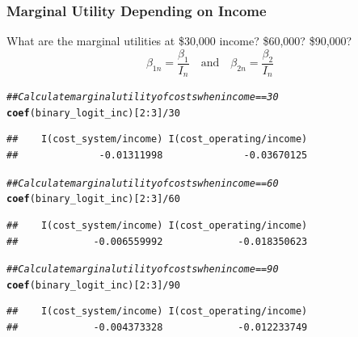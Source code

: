 \documentclass{beamer}\usepackage[]{graphicx}\usepackage[]{color}
\makeatletter
\newcommand{\hlnum}[1]{\textcolor[rgb]{0.686,0.059,0.569}{#1}}%
\newcommand{\hlcom}[1]{\textcolor[rgb]{0.678,0.584,0.686}{\textit{#1}}}%
\newcommand{\hlopt}[1]{\textcolor[rgb]{0,0,0}{#1}}%
\newcommand{\hlstd}[1]{\textcolor[rgb]{0.345,0.345,0.345}{#1}}%
\newcommand{\hlkwd}[1]{\textcolor[rgb]{0.737,0.353,0.396}{\textbf{#1}}}%
\newenvironment{kframe}{%
 \def\at@end@of@kframe{}%
 \ifinner\ifhmode%
  \def\at@end@of@kframe{\end{minipage}}%
  \begin{minipage}{\columnwidth}%
 \fi\fi%
 \def\FrameCommand##1{\hskip\@totalleftmargin \hskip-\fboxsep
 \colorbox{shadecolor}{##1}\hskip-\fboxsep
     \hskip-\linewidth \hskip-\@totalleftmargin \hskip\columnwidth}%
 \MakeFramed {\advance\hsize-\width
   \@totalleftmargin\z@ \linewidth\hsize
   \@setminipage}}%
 {\par\unskip\endMakeFramed%
 \at@end@of@kframe}
\newenvironment{knitrout}{}{} %
\makeatother
\begin{document}
\begin{frame}[fragile]\frametitle{Marginal Utility Depending on Income}
    What are the marginal utilities at \$30,000 income? \$60,000? \$90,000?
    $$\beta_{1n} = \frac{\beta_1}{I_n} \quad \text{and} \quad \beta_{2n} = \frac{\beta_2}{I_n}$$
\begin{knitrout}\footnotesize
{}\color{fgcolor}\begin{kframe}
\begin{alltt}
\hlcom{## Calculate marginal utility of costs when income == 30}
\hlkwd{coef}\hlstd{(binary_logit_inc)[}\hlnum{2}\hlopt{:}\hlnum{3}\hlstd{]} \hlopt{/} \hlnum{30}
\end{alltt}
\begin{verbatim}
##    I(cost_system/income) I(cost_operating/income) 
##              -0.01311998              -0.03670125
\end{verbatim}
\begin{alltt}
\hlcom{## Calculate marginal utility of costs when income == 60}
\hlkwd{coef}\hlstd{(binary_logit_inc)[}\hlnum{2}\hlopt{:}\hlnum{3}\hlstd{]} \hlopt{/} \hlnum{60}
\end{alltt}
\begin{verbatim}
##    I(cost_system/income) I(cost_operating/income) 
##             -0.006559992             -0.018350623
\end{verbatim}
\begin{alltt}
\hlcom{## Calculate marginal utility of costs when income == 90}
\hlkwd{coef}\hlstd{(binary_logit_inc)[}\hlnum{2}\hlopt{:}\hlnum{3}\hlstd{]} \hlopt{/} \hlnum{90}
\end{alltt}
\begin{verbatim}
##    I(cost_system/income) I(cost_operating/income) 
##             -0.004373328             -0.012233749
\end{verbatim}
\end{kframe}
\end{knitrout}
\end{frame}
\end{document}
